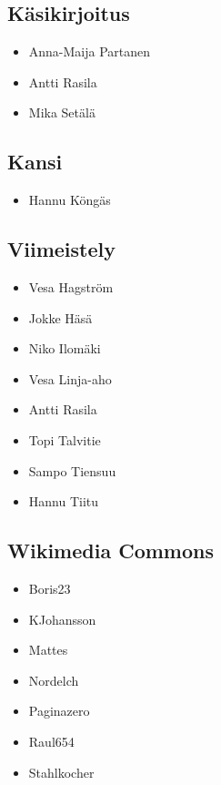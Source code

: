 \subsection*{Käsikirjoitus}
\begin{itemize}
\item Anna-Maija Partanen
\item Antti Rasila
\item Mika Setälä
\end{itemize}

\subsection*{Kansi}
\begin{itemize}
\item Hannu Köngäs
\end{itemize}

\subsection*{Viimeistely}
\begin{itemize}
\item Vesa Hagström
\item Jokke Häsä
\item Niko Ilomäki
\item Vesa Linja-aho
\item Antti Rasila
\item Topi Talvitie
\item Sampo Tiensuu
\item Hannu Tiitu
\end{itemize}

\subsection*{Wikimedia Commons}
\begin{itemize}
\item Boris23
\item KJohansson
\item Mattes
\item Nordelch
\item Paginazero
\item Raul654
\item Stahlkocher
\end{itemize}
